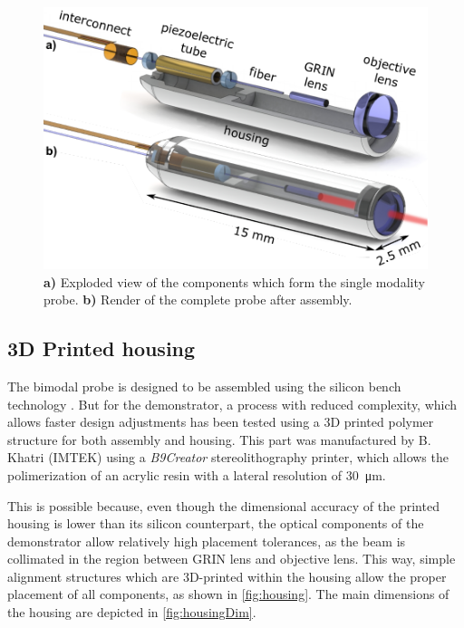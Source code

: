 \documentclass[10pt]{iopart}
\begin{document}
\begin{figure}[h!]\centering \includegraphics[width=\columnwidth]{figures/explodedRenderNames.pdf}
      \caption{\textbf{a)} Exploded view of the components which form the single modality probe.
      \textbf{b)} Render of the complete probe after assembly.}
      \label{fig:exploded}
\end{figure}


\subsection{3D Printed housing}

The bimodal probe is designed to be assembled using the silicon bench technology \cite{Kretschmer}. But for the demonstrator, a process with reduced complexity, which allows faster design adjustments has been tested using a 3D printed polymer structure for both assembly and housing. This part was manufactured by B. Khatri (IMTEK) using a \textit{B9Creator} stereolithography printer, which allows the polimerization of an acrylic resin with a lateral resolution of \SI{30}{\micro\meter}.

This is possible because, even though the dimensional accuracy of the printed housing is lower than its silicon counterpart, the optical components of the demonstrator allow relatively high placement tolerances, as the beam is collimated in the region between GRIN lens and objective lens. This way, simple alignment structures which are 3D-printed within the housing allow the proper placement of all components, as shown in \autoref{fig:housing}. The main dimensions of the housing are depicted in \autoref{fig:housingDim}.
\end{document}
